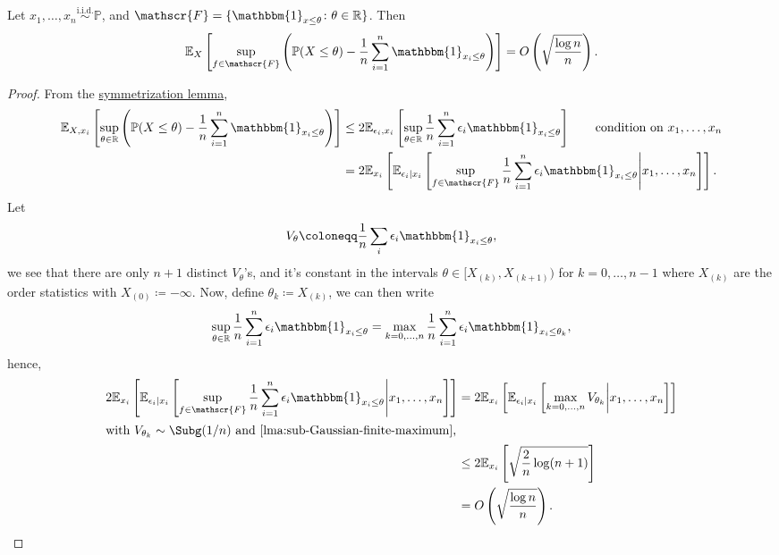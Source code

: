 \begin{proposition}\label{prop:symmetrization}
	Let \(x_1, \dots , x_n \overset{\text{i.i.d.} }{\sim } \mathbb{P} \), and \(\mathscr{F} = \{ \mathbbm{1}_{x \leq \theta} \colon \theta \in \mathbb{R} \} \). Then
	\[
		\mathbb{E}_{X}\left[ \sup _{f\in \mathscr{F} } \left( \mathbb{P} (X \leq \theta ) - \frac{1}{n}\sum_{i=1}^{n} \mathbbm{1}_{x_i \leq \theta } \right) \right] = O\left( \sqrt{\frac{\log n}{n}}  \right).
	\]
\end{proposition}
\begin{proof}
	From the \hyperref[lma:symmetrization]{symmetrization lemma},
	\begin{align*}
		\mathbb{E}_{X, x_i}\left[\sup _{\theta \in \mathbb{R} } \left( \mathbb{P} (X \leq \theta ) - \frac{1}{n} \sum_{i=1}^{n} \mathbbm{1}_{x_i \leq \theta } \right) \right]
		 & \leq 2 \mathbb{E}_{\epsilon _i, x_i}\left[\sup _{\theta \in \mathbb{R} } \frac{1}{n}\sum_{i=1}^{n} \epsilon _i \mathbbm{1}_{x_i \leq \theta } \right]\tag*{condition on \(x_1, \dots , x_n\)}                   \\
		 & = 2 \mathbb{E}_{x_i}\left[ \mathbb{E}_{\epsilon _i \mid x_i}\left[ \sup _{f\in \mathscr{F} } \frac{1}{n} \sum_{i=1}^{n} \epsilon _i \mathbbm{1}_{x_i \leq \theta } \middle| x_1, \dots , x_n \right]  \right] .
	\end{align*}
	Let
	\[
		V_\theta \coloneqq \frac{1}{n}\sum_{i} \epsilon _i \mathbbm{1}_{x_i \leq \theta } ,
	\]
	we see that there are only \(n+1\) distinct \(V_\theta \)'s, and it's constant in the intervals \(\theta \in [X_{(k)}, X_{(k+1)})\) for \(k = 0, \dots , n-1\) where \(X_{(k)}\) are the order statistics with \(X_{(0)} \coloneqq -\infty \). Now, define \(\theta _k \coloneqq X_{(k)}\), we can then write
	\[
		\sup _{\theta \in \mathbb{R} }\frac{1}{n} \sum_{i=1}^{n} \epsilon _i \mathbbm{1}_{x_i \leq \theta }
		= \max _{k=0, \dots , n} \frac{1}{n}\sum_{i=1}^{n} \epsilon _i \mathbbm{1}_{x_i \leq \theta _k},
	\]
	hence,
	\begin{align*}
		2 \mathbb{E}_{x_i}\left[ \mathbb{E}_{\epsilon _i \mid x_i}\left[ \sup _{f\in \mathscr{F} } \frac{1}{n} \sum_{i=1}^{n} \epsilon _i \mathbbm{1}_{x_i \leq \theta } \middle| x_1, \dots , x_n \right]  \right]
		 & = 2 \mathbb{E}_{x_i}\left[ \mathbb{E}_{\epsilon _i \mid x_i}\left[ \max _{k=0, \dots , n} V_{\theta _k} \middle| x_1, \dots , x_n \right]  \right] \\
		\shortintertext{with \(V_{\theta _k} \sim \Subg(1 / n) \) and \autoref{lma:sub-Gaussian-finite-maximum},}
		 & \leq 2 \mathbb{E}_{x_i}\left[ \sqrt{\frac{2}{n} \log (n+1)} \right]                                                                                \\
		 & = O\left( \sqrt{\frac{\log n	}{n}} \right).
	\end{align*}
\end{proof}

